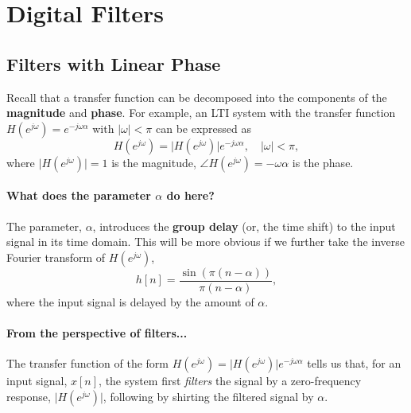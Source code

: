 \section{Digital Filters}

\subsection{Filters with Linear Phase}
Recall that a transfer function can be decomposed into the components of the \textbf{magnitude} and \textbf{phase}. For example, an LTI system with the transfer function $H(e^{j\omega}) = e^{-j\omega \alpha}$ with $\lvert \omega \rvert < \pi$ can be expressed as
\[
    H(e^{j\omega}) = \lvert H(e^{j\omega}) \rvert e^{-j\omega \alpha}, \quad \lvert \omega \rvert < \pi,
\]
where $\lvert H(e^{j\omega}) \rvert = 1$ is the magnitude, $\angle H(e^{j\omega}) = -\omega \alpha$ is the phase. 

\paragraph{What does the parameter $\alpha$ do here?} The parameter, $\alpha$, introduces the \textbf{group delay} (or, the time shift) to the input signal in its time domain. This will be more obvious if we further take the inverse Fourier transform of $H(e^{j\omega})$,
\[
    h[n] = \frac{\sin \left (\pi(n-\alpha) \right)}{\pi(n-\alpha)},
\]
where the input signal is delayed by the amount of $\alpha$.

\paragraph{From the perspective of filters...} The transfer function of the form $H(e^{j\omega}) = \lvert H(e^{j\omega}) \rvert e^{-j\omega \alpha}$ tells us that, for an input signal, $x[n]$, the system first \textit{filters} the signal by a zero-frequency response, $\lvert H(e^{j\omega}) \rvert$, following by shirting the filtered signal by $\alpha$. 

